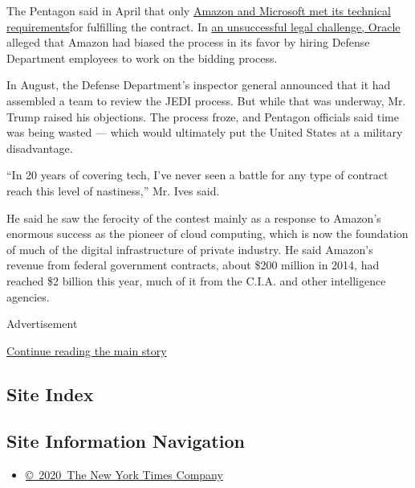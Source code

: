 The Pentagon said in April that only
\href{https://www.nytimes.com/2019/04/10/technology/amazon-microsoft-jedi-pentagon.html}{Amazon
and Microsoft met its technical requirements}for fulfilling the
contract. In
\href{https://www.nytimes.com/2019/03/20/technology/military-contract-deap-ubhi.html?module=inline}{an
unsuccessful legal challenge, Oracle} alleged that Amazon had biased the
process in its favor by hiring Defense Department employees to work on
the bidding process.

In August, the Defense Department's inspector general announced that it
had assembled a team to review the JEDI process. But while that was
underway, Mr. Trump raised his objections. The process froze, and
Pentagon officials said time was being wasted --- which would ultimately
put the United States at a military disadvantage.

``In 20 years of covering tech, I've never seen a battle for any type of
contract reach this level of nastiness,'' Mr. Ives said.

He said he saw the ferocity of the contest mainly as a response to
Amazon's enormous success as the pioneer of cloud computing, which is
now the foundation of much of the digital infrastructure of private
industry. He said Amazon's revenue from federal government contracts,
about \$200 million in 2014, had reached \$2 billion this year, much of
it from the C.I.A. and other intelligence agencies.

Advertisement

\protect\hyperlink{after-bottom}{Continue reading the main story}

\hypertarget{site-index}{%
\subsection{Site Index}\label{site-index}}

\hypertarget{site-information-navigation}{%
\subsection{Site Information
Navigation}\label{site-information-navigation}}

\begin{itemize}
\tightlist
\item
  \href{https://help.nytimes.com/hc/en-us/articles/115014792127-Copyright-notice}{©~2020~The
  New York Times Company}
\end{itemize}

